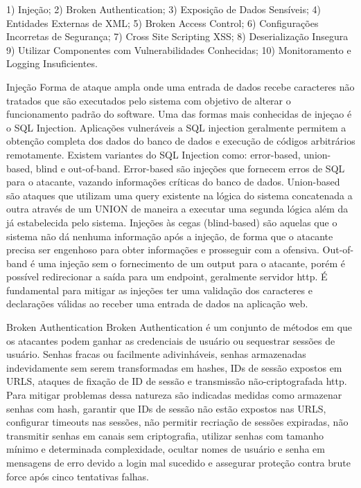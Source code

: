 1) Injeção;
2) Broken Authentication;
3) Exposição de Dados Sensíveis;
4) Entidades Externas de XML;
5) Broken Access Control;
6) Configurações Incorretas de Segurança;
7) Cross Site Scripting XSS;
8) Deserialização Insegura
9) Utilizar Componentes com Vulnerabilidades Conhecidas;
10) Monitoramento e Logging Insuficientes.

Injeção
Forma de ataque ampla onde uma entrada de dados recebe caracteres não tratados que são executados pelo sistema com objetivo de alterar o funcionamento padrão do software.
Uma das formas mais conhecidas de injeçao é o SQL Injection. Aplicações vulneráveis a SQL injection geralmente permitem a obtenção completa dos dados do banco de dados e execução de códigos arbitrários remotamente. Existem variantes do SQL Injection como: error-based, union-based, blind e out-of-band. Error-based são injeções que fornecem erros de SQL para o atacante, vazando informações críticas do banco de dados. Union-based são ataques que utilizam uma query existente na lógica do sistema concatenada a outra através de um UNION de maneira a executar uma segunda lógica além da já estabelecida pelo sistema. Injeções às cegas (blind-based) são aquelas que o sistema não dá nenhuma informação após a injeção, de forma que o atacante precisa ser engenhoso para obter informações e prosseguir com a ofensiva. Out-of-band é uma injeção sem o fornecimento de um output para o atacante, porém é possível redirecionar a saída para um endpoint, geralmente servidor http.
É fundamental para mitigar as injeções ter uma validação dos caracteres e declarações válidas ao receber uma entrada de dados na aplicação web.

Broken Authentication
Broken Authentication é um conjunto de métodos em que os atacantes podem ganhar as credenciais de usuário ou sequestrar sessões de usuário. Senhas fracas ou facilmente adivinháveis, senhas armazenadas indevidamente sem serem transformadas em hashes, IDs de sessão expostos em URLS, ataques de fixação de ID de sessão e transmissão não-criptografada http.
Para mitigar problemas dessa natureza são indicadas medidas como armazenar senhas com hash, garantir que IDs de sessão não estão expostos nas URLS, configurar timeouts nas sessões, não permitir recriação de sessões expiradas, não transmitir senhas em canais sem criptografia, utilizar senhas com tamanho mínimo e determinada complexidade, ocultar nomes de usuário e senha em mensagens de erro devido a login mal sucedido e assegurar proteção contra brute force após cinco tentativas falhas.

